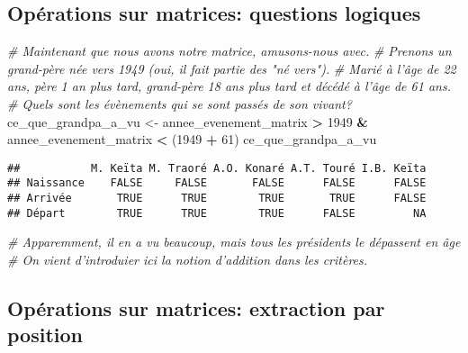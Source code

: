 \documentclass[]{book}
\newenvironment{Shaded}{\begin{snugshade}}{\end{snugshade}}
\newcommand{\DecValTok}[1]{\textcolor[rgb]{0.00,0.00,0.81}{#1}}
\newcommand{\StringTok}[1]{\textcolor[rgb]{0.31,0.60,0.02}{#1}}
\newcommand{\CommentTok}[1]{\textcolor[rgb]{0.56,0.35,0.01}{\textit{#1}}}
\newcommand{\OperatorTok}[1]{\textcolor[rgb]{0.81,0.36,0.00}{\textbf{#1}}}
\newcommand{\NormalTok}[1]{#1}
\begin{document}
\normalsize

\subsection{Opérations sur matrices: questions
logiques}\label{operations-sur-matrices-questions-logiques}

\tiny

\begin{Shaded}
\begin{Highlighting}[]
\CommentTok{# Maintenant que nous avons notre matrice, amusons-nous avec.}
\CommentTok{# Prenons un grand-père née vers 1949 (oui, il fait partie des "né vers").}
\CommentTok{# Marié à l'âge de 22 ans, père 1 an plus tard, grand-père 18 ans plus tard et décédé à l'âge de 61 ans.}
\CommentTok{# Quels sont les évènements qui se sont passés de son vivant?}
\NormalTok{ce_que_grandpa_a_vu <-}\StringTok{ }\NormalTok{annee_evenement_matrix }\OperatorTok{>}\StringTok{ }\DecValTok{1949} \OperatorTok{&}\StringTok{ }\NormalTok{annee_evenement_matrix }\OperatorTok{<}\StringTok{ }\NormalTok{(}\DecValTok{1949} \OperatorTok{+}\StringTok{ }\DecValTok{61}\NormalTok{)}
\NormalTok{ce_que_grandpa_a_vu}
\end{Highlighting}
\end{Shaded}

\begin{verbatim}
##           M. Keïta M. Traoré A.O. Konaré A.T. Touré I.B. Keïta
## Naissance    FALSE     FALSE       FALSE      FALSE      FALSE
## Arrivée       TRUE      TRUE        TRUE       TRUE      FALSE
## Départ        TRUE      TRUE        TRUE      FALSE         NA
\end{verbatim}

\begin{Shaded}
\begin{Highlighting}[]
\CommentTok{# Apparemment, il en a vu beaucoup, mais tous les présidents le dépassent en âge}
\CommentTok{# On vient d'introduier ici la notion d'addition dans les critères.}
\end{Highlighting}
\end{Shaded}

\normalsize

\subsection{Opérations sur matrices: extraction par
position}\label{operations-sur-matrices-extraction-par-position}
\end{document}
